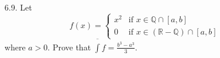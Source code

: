 \documentclass[9pt]{article}
\newcommand{\Q}{\mathbb{Q}}
\newcommand{\R}{\mathbb{R}}
\newcommand{\D}{\displaystyle}
\begin{document}
\begin{enumerate}
   \item[6.9.] Let    
               \begin{equation*}
                  f(x) = \left\{
                     \begin{array}{ll}
                        x^2  & \text{if } x \in \Q \cap [a, b] \\
                        0    & \text{if } x \in (\R - \Q) \cap [a, b]
                     \end{array} \right.
               \end{equation*}
               where $a > 0$. Prove that
               $\D\overline{\int} f = \frac{b^3-a^3}{3}$.
               

\end{enumerate}
\end{document}
